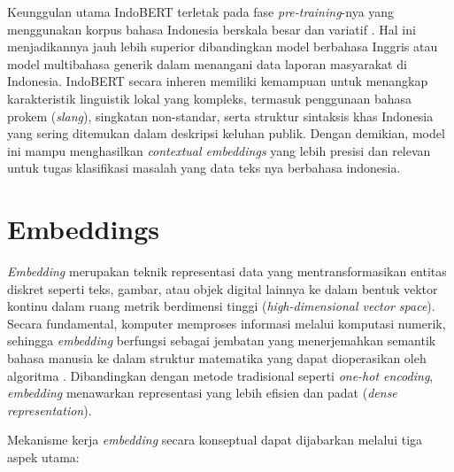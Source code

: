 Keunggulan utama IndoBERT terletak pada fase \textit{pre-training}-nya yang menggunakan korpus bahasa Indonesia berskala besar dan variatif \citep{wilieIndoNLUBenchmarkResources2020}. Hal ini menjadikannya jauh lebih superior dibandingkan model berbahasa Inggris atau model multibahasa generik dalam menangani data laporan masyarakat di Indonesia. IndoBERT secara inheren memiliki kemampuan untuk menangkap karakteristik linguistik lokal yang kompleks, termasuk penggunaan bahasa prokem (\textit{slang}), singkatan non-standar, serta struktur sintaksis khas Indonesia yang sering ditemukan dalam deskripsi keluhan publik. Dengan demikian, model ini mampu menghasilkan \textit{contextual embeddings} yang lebih presisi dan relevan untuk tugas klasifikasi masalah yang data teks nya berbahasa indonesia.

\section{Embeddings}
\textit{Embedding} merupakan teknik representasi data yang mentransformasikan entitas diskret seperti teks, gambar, atau objek digital lainnya ke dalam bentuk vektor kontinu dalam ruang metrik berdimensi tinggi (\textit{high-dimensional vector space}). Secara fundamental, komputer memproses informasi melalui komputasi numerik, sehingga \textit{embedding} berfungsi sebagai jembatan yang menerjemahkan semantik bahasa manusia ke dalam struktur matematika yang dapat dioperasikan oleh algoritma \citep{mikolov2013efficientestimationwordrepresentations}. Dibandingkan dengan metode tradisional seperti \textit{one-hot encoding}, \textit{embedding} menawarkan representasi yang lebih efisien dan padat (\textit{dense representation}).

Mekanisme kerja \textit{embedding} secara konseptual dapat dijabarkan melalui tiga aspek utama:

